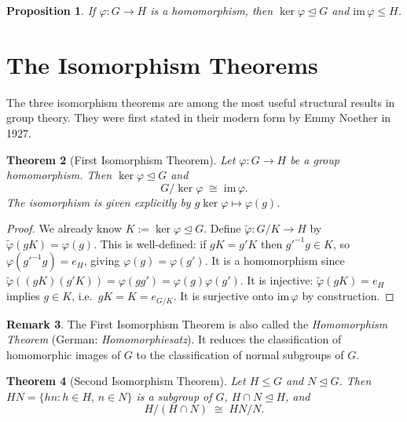 \documentclass[12pt,a4paper]{amsart}
\newtheorem{theorem}{Theorem}[section]
\newtheorem{proposition}[theorem]{Proposition}
\theoremstyle{definition}
\newtheorem{remark}[theorem]{Remark}
\begin{document}
\begin{proposition}
If $\varphi : G \to H$ is a homomorphism, then $\ker\varphi \trianglelefteq G$
and $\mathrm{im}\,\varphi \leq H$.
\end{proposition}

\section{The Isomorphism Theorems}
\label{sec:isomorphism}

The three isomorphism theorems are among the most useful structural results in group
theory. They were first stated in their modern form by Emmy Noether in 1927.

\begin{theorem}[First Isomorphism Theorem]
\label{thm:first_iso}
Let $\varphi : G \to H$ be a group homomorphism. Then $\ker\varphi \trianglelefteq G$
and
\[
  G / \ker\varphi \;\cong\; \mathrm{im}\,\varphi.
\]
The isomorphism is given explicitly by $g\ker\varphi \mapsto \varphi(g)$.
\end{theorem}

\begin{proof}
We already know $K := \ker\varphi \trianglelefteq G$.
Define $\tilde\varphi : G/K \to H$ by $\tilde\varphi(gK) = \varphi(g)$.
This is well-defined: if $gK = g'K$ then $g'^{-1}g \in K$, so
$\varphi(g'^{-1}g) = e_H$, giving $\varphi(g) = \varphi(g')$.
It is a homomorphism since $\tilde\varphi((gK)(g'K)) = \varphi(gg') = \varphi(g)\varphi(g')$.
It is injective: $\tilde\varphi(gK) = e_H$ implies $g \in K$, i.e.\ $gK = K = e_{G/K}$.
It is surjective onto $\mathrm{im}\,\varphi$ by construction.
\end{proof}

\begin{remark}
The First Isomorphism Theorem is also called the \emph{Homomorphism Theorem}
(German: \emph{Homomorphiesatz}). It reduces the classification of homomorphic images of
$G$ to the classification of normal subgroups of $G$.
\end{remark}

\begin{theorem}[Second Isomorphism Theorem]
\label{thm:second_iso}
Let $H \leq G$ and $N \trianglelefteq G$. Then $HN = \{hn : h \in H,\, n \in N\}$
is a subgroup of $G$, $H \cap N \trianglelefteq H$, and
\[
  H / (H \cap N) \;\cong\; HN / N.
\]
\end{theorem}
\end{document}
